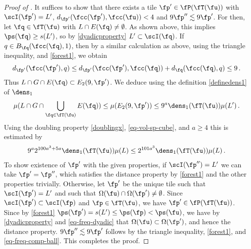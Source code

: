 \begin{proof}[Proof of ]
    It suffices to show that there exists a tile $\fp' \in \fP(\fT(\fu))$ with $\scI(\fp') = L'$, $d_{\fp'}(\fcc(\fp'), \fcc(\fu)) < 4$ and $9\fp'' \lesssim 9\fp'$.
    For then, let $\fq \in \fT(\fu)$ with $L \cap E(\fq) \ne \emptyset$. As shown above, this implies $\ps(\fq) \ge s(L')$, so by \eqref{dyadicproperty} $L' \subset \scI(\fq)$.
    If $q \in B_{\fq}(\fcc(\fq), 1)$, then by a similar calculation as above, using the triangle inequality,  and \eqref{forest1}, we obtain
    $$
        d_{\fp'}(\fcc(\fp'), q) \le d_{\fp'}(\fcc(\fp'), \fcc(\fq)) + d_{\fq}(\fcc(\fq), q) \le 9\,.
    $$
    Thus $L \cap G \cap E(\fq) \subset E_2(9, \fp')$. We deduce using the definition \eqref{definedens1} of $\dens_1$
    $$
        \mu(L \cap G \cap \bigcup_{\fq \in \fT(\fu)} E(\fq)) \le \mu(E_2(9, \fp')) \le 9^a \dens_1(\fT(\fu)) \mu(L')\,.
    $$
    Using the doubling property \eqref{doublingx}, \eqref{eq-vol-sp-cube}, and $a \ge 4$ this is estimated by
    $$
        9^a 2^{100a^3 + 5a}\dens_1(\fT(\fu)) \mu(L) \le 2^{101 a^3} \dens_1(\fT(\fu))\mu(L)\,.
    $$
    To show existence of $\fp'$ with the given properties, if $\scI(\fp'') = L'$ we can take $\fp' = \fp''$, which satisfies the distance property by \eqref{forest1} and the other properties trivially.
    Otherwise, let $\fp'$ be the unique tile such that $\scI(\fp') = L'$ and such that $\Omega(\fu) \cap \Omega(\fp') \ne \emptyset$.
    Since $\scI(\fp') \subset \scI(\fp)$ and $\fp \in \fT(\fu)$, we have $\fp' \in \fP(\fT(\fu))$.
    Since by \eqref{forest1} $\ps(\fp') = s(L') \le \ps(\fp) < \ps(\fu)$, we have by \eqref{dyadicproperty} and \eqref{eq-freq-dyadic} that $\Omega(\fu) \subset \Omega(\fp')$, and hence the distance property.
    $9\fp'' \lesssim 9\fp'$ follows by the triangle inequality, \eqref{forest1},  and \eqref{eq-freq-comp-ball}.
    This completes the proof.
\end{proof}

